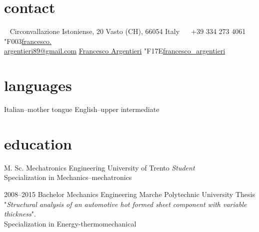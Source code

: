 \documentclass[]{friggeri-cv} %
\newcommand{\LinkedinColour}{{\color{linkedin}{\fatest\char"F08C}}}
\newcommand{\Email}{{\color{black} \fatest\char"F003}}
\newcommand{\Skype}{{\color{skypeblue} \fatest\char"F17E}}
\begin{document}


\begin{aside} %
\section{contact}
~
Circonvallazione Istoniense, 20
Vasto (CH), 66054
Italy
~
\color{phonegreen}\faPhone \, +39 334 273 4061
~
\Email \href{mailto:francesco.argentieri89@gmail.com}{francesco.\\argentieri89@gmail.com}
\LinkedinColour \href{https://it.linkedin.com/in/francesco-argentieri}{Francesco Argentieri}
\Skype \href{skype:my_username?add}{francesco\_argentieri}
\section{languages}
Italian--mother tongue
English--upper intermediate
\end{aside}


\section{education}

\begin{entrylist}


{M. Sc. {\normalfont Mechatronics Engineering}}
{University of Trento}
{\emph{Student}\\ Specialization in Mechanics--mechatronics}


\entry
{2008--2015}
{Bachelor {\normalfont Mechanics Engineering}}
{Marche Polytechnic University}
{Thesis "\emph{Structural analysis of an automotive hot formed sheet component with variable thickness}".\\
Specialization in Energy-thermomechanical}


\end{entrylist}
\end{document}
